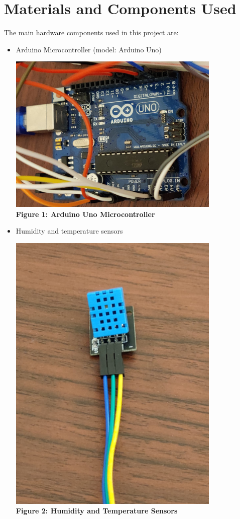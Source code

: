 \documentclass[a4paper,12pt]{article}
\begin{document}
	\section{Materials and Components Used}
	The main hardware components used in this project are:
	\begin{itemize}
		\item Arduino Microcontroller (model: Arduino Uno)
		\begin{center}
			\includegraphics[width=0.8\textwidth]{arduino.png}\\
			\textbf{Figure 1: Arduino Uno Microcontroller}
		\end{center}
		
		\item Humidity and temperature sensors
		\begin{center}
			\includegraphics[width=0.8\textwidth]{humidity.png}\\
			\textbf{Figure 2: Humidity and Temperature Sensors}
		\end{center}
		

\end{itemize}
\end{document}
